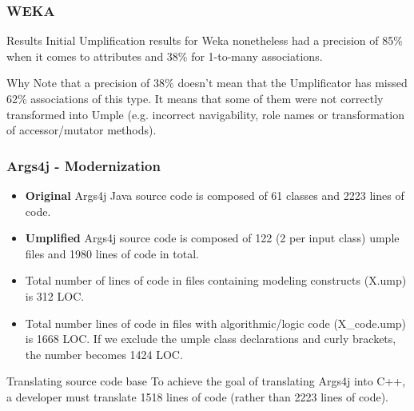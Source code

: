 \documentclass[xcolor=table]{beamer}
\begin{document}
\begin{frame}
\frametitle{WEKA}
\begin{block}{Results}
Initial Umplification results for Weka nonetheless had a precision of 85\% when it comes to attributes and 38\% for 1-to-many associations.
\end{block}

\begin{block}{Why}
Note that a precision of 38\% doesn't mean that the Umplificator has missed 62\% associations of this type. It means that some of them were not correctly transformed into Umple (e.g. incorrect navigability, role names or transformation of accessor/mutator methods).
\end{block}
\end{frame}


\begin{frame}
\frametitle{Args4j  - Modernization}

\begin{itemize}
\item \textbf{Original} Args4j Java source code is composed of 61 classes and 2223 lines of code.
\item \textbf{Umplified} Args4j source code is composed of 122 (2 per input class) umple files and 1980 lines of code in total.
\item Total number of lines of code in files containing modeling constructs (X.ump) is 312 LOC.
\item Total number lines of code in files with algorithmic/logic code (X\_code.ump) is 1668 LOC. If we exclude the umple class declarations and curly brackets, the number becomes 1424 LOC.
\end{itemize}

\begin{block}{Translating source code base}
To achieve the goal of translating Args4j into C++, a developer must translate 1518 lines of code (rather than 2223 lines of code). 
\end{block}
\end{frame}

\end{document}
